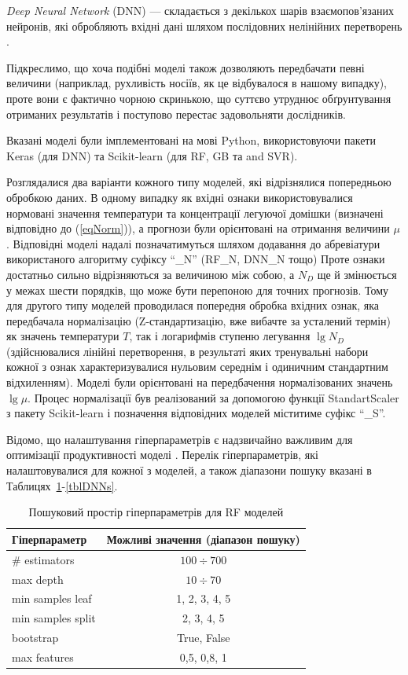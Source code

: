 \documentclass[10pt,a5paper,titlepage,oneside]{book}
\numberwithin{equation}{part}
\begin{document}
\noindent
\emph{Deep Neural Network} (DNN) --- складається з декількох шарів взаємопов'язаних нейронів, які обробляють вхідні дані
шляхом послідовних нелінійних перетворень \cite{Liu2023}.

Підкреслимо, що хоча подібні моделі також дозволяють передбачати певні величини (наприклад, рухливість носіїв,
як це відбувалося в нашому випадку), проте вони є фактично чорною скринькою, що суттєво утруднює обґрунтування отриманих результатів
і поступово перестає задовольняти дослідників.


Вказані моделі були імплементовані на мові Python,
використовуючи пакети Keras (для DNN) та Scikit-learn (для RF, GB та and SVR).

Розглядалися два варіанти кожного типу моделей, які відрізнялися попередньою обробкою даних.
В одному випадку як вхідні ознаки використовувалися нормовані значення температури та концентрації легуючої домішки
(визначені відповідно до (\ref{eqNorm})), а прогнози були орієнтовані на отримання величини $\mu$.
Відповідні моделі надалі позначатимуться шляхом додавання до абревіатури використаного алгоритму суфіксу ``\_N'' (RF\_N, DNN\_N тощо)
Проте ознаки достатньо сильно відрізняються за величиною між собою, а $N_D$ ще й змінюється у межах шести порядків,
що може бути перепоною для точних прогнозів.
Тому для другого типу моделей проводилася попередня обробка вхідних ознак, яка передбачала нормалізацію (Z-стандартизацію, вже вибачте за усталений термін)
як значень температури $T$,
так і логарифмів ступеню легування $\lg N_D$
(здійснювалися лінійні перетворення, в результаті яких тренувальні набори кожної з ознак характеризувалися нульовим середнім і одиничним стандартним відхиленням).
Моделі були орієнтовані на передбачення нормалізованих значень $\lg \mu$.
Процес нормалізації був реалізований за допомогою функції StandartScaler з пакету Scikit-learn і позначення відповідних моделей міститиме суфікс ``\_S''.

Відомо, що налаштування гіперпараметрів  є надзвичайно важливим для оптимізації продуктивності моделі \cite{Hanif2024}.
Перелік гіперпараметрів, які налаштовувалися для кожної з моделей, а також діапазони пошуку вказані в Таблицях~\ref{tblRFs}-\ref{tblDNNs}.


\begin{table}
\caption{Пошуковий простір гіперпараметрів для RF моделей }
\label{tblRFs}
\centering
\begin{tabular}{|l|c|}
\hline
Гіперпараметр&Можливі значення (діапазон пошуку)\\
\hline
\# estimators&	$100\div700$\\
\hline
max depth&	$10\div70$\\
\hline
min samples leaf &	1, 2, 3, 4, 5\\
\hline
min samples split	&2, 3, 4, 5\\
\hline
bootstrap	& True, False \\
\hline
max features &	0,5, 0,8, 1\\
\hline
\end{tabular}
\end{table}
\end{document}
